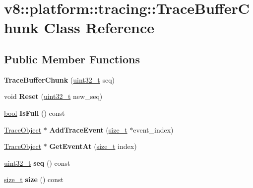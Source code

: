\hypertarget{classv8_1_1platform_1_1tracing_1_1TraceBufferChunk}{}\section{v8\+:\+:platform\+:\+:tracing\+:\+:Trace\+Buffer\+Chunk Class Reference}
\label{classv8_1_1platform_1_1tracing_1_1TraceBufferChunk}
\subsection*{Public Member Functions}
\begin{DoxyCompactItemize}
\item 
\mbox{\label{classv8_1_1platform_1_1tracing_1_1TraceBufferChunk_a553b81d9a3c51fece0361a769e8d55ed}} 
{\bfseries Trace\+Buffer\+Chunk} (\mbox{\hyperlink{classuint32__t}{uint32\+\_\+t}} seq)
\item 
\mbox{\label{classv8_1_1platform_1_1tracing_1_1TraceBufferChunk_a826d9e811145daf9ce45eb217e42869d}} 
void {\bfseries Reset} (\mbox{\hyperlink{classuint32__t}{uint32\+\_\+t}} new\+\_\+seq)
\item 
\mbox{\label{classv8_1_1platform_1_1tracing_1_1TraceBufferChunk_a7d9492b110b2fff2b56d4b8ff7acab66}} 
\mbox{\hyperlink{classbool}{bool}} {\bfseries Is\+Full} () const
\item 
\mbox{\label{classv8_1_1platform_1_1tracing_1_1TraceBufferChunk_a7c19912932cc169d38f5916e3e95b478}} 
\mbox{\hyperlink{classv8_1_1platform_1_1tracing_1_1TraceObject}{Trace\+Object}} $\ast$ {\bfseries Add\+Trace\+Event} (\mbox{\hyperlink{classsize__t}{size\+\_\+t}} $\ast$event\+\_\+index)
\item 
\mbox{\label{classv8_1_1platform_1_1tracing_1_1TraceBufferChunk_ad3f2e762a6399317745b2b6553618967}} 
\mbox{\hyperlink{classv8_1_1platform_1_1tracing_1_1TraceObject}{Trace\+Object}} $\ast$ {\bfseries Get\+Event\+At} (\mbox{\hyperlink{classsize__t}{size\+\_\+t}} index)
\item 
\mbox{\label{classv8_1_1platform_1_1tracing_1_1TraceBufferChunk_a3ef801b00f591dab1e0222730328c605}} 
\mbox{\hyperlink{classuint32__t}{uint32\+\_\+t}} {\bfseries seq} () const
\item 
\mbox{\label{classv8_1_1platform_1_1tracing_1_1TraceBufferChunk_a0da81d83e57507fed594521aea0640b5}} 
\mbox{\hyperlink{classsize__t}{size\+\_\+t}} {\bfseries size} () const
\end{DoxyCompactItemize}
